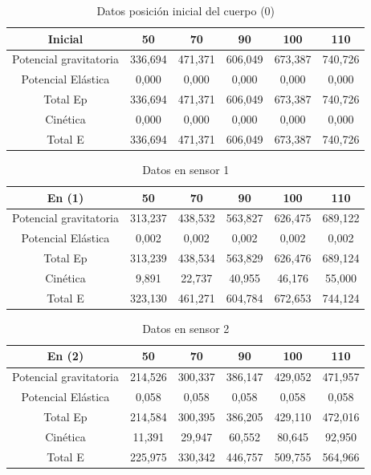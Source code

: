 \documentclass[a4paper]{article}
\begin{document}
\begin{table}[H]
    \centering
    \begin{tabular}{|c|c|c|c|c|c|}
    \hline
        Inicial & 50 & 70 & 90 & 100 & 110  \\ \hline
        Potencial gravitatoria & 336,694 & 471,371 & 606,049 & 673,387 & 740,726  \\ \hline
        Potencial Elástica & 0,000 & 0,000 & 0,000 & 0,000 & 0,000  \\ \hline
        Total Ep & 336,694 & 471,371 & 606,049 & 673,387 & 740,726  \\ \hline
        Cinética & 0,000 & 0,000 & 0,000 & 0,000 & 0,000  \\ \hline
        Total E & 336,694 & 471,371 & 606,049 & 673,387 & 740,726  \\ \hline
    \end{tabular}
\caption{Datos posición inicial del cuerpo (0)}
\label{Datos posición inicial del cuerpo}
\end{table}

\begin{table}[H]
    \centering
    \begin{tabular}{|c|c|c|c|c|c|}
    \hline
        En (1) & 50 & 70 & 90 & 100 & 110  \\ \hline
        Potencial gravitatoria & 313,237 & 438,532 & 563,827 & 626,475 & 689,122  \\ \hline
        Potencial Elástica & 0,002 & 0,002 & 0,002 & 0,002 & 0,002  \\ \hline
        Total Ep & 313,239 & 438,534 & 563,829 & 626,476 & 689,124  \\ \hline
        Cinética & 9,891 & 22,737 & 40,955 & 46,176 & 55,000  \\ \hline
        Total E & 323,130 & 461,271 & 604,784 & 672,653 & 744,124  \\ \hline
    \end{tabular}
    \caption{Datos en sensor 1}
    \label{Datos en sensor 1}
\end{table}

\begin{table}[H]
    \centering
    \begin{tabular}{|c|c|c|c|c|c|}
    \hline
        En (2) & 50 & 70 & 90 & 100 & 110  \\ \hline
        Potencial gravitatoria & 214,526 & 300,337 & 386,147 & 429,052 & 471,957  \\ \hline
        Potencial Elástica & 0,058 & 0,058 & 0,058 & 0,058 & 0,058  \\ \hline
        Total Ep & 214,584 & 300,395 & 386,205 & 429,110 & 472,016  \\ \hline
        Cinética & 11,391 & 29,947 & 60,552 & 80,645 & 92,950  \\ \hline
        Total E & 225,975 & 330,342 & 446,757 & 509,755 & 564,966  \\ \hline
    \end{tabular}
    \caption{Datos en sensor 2}
    \label{Datos en sensor 2}
\end{table}
\end{document}
